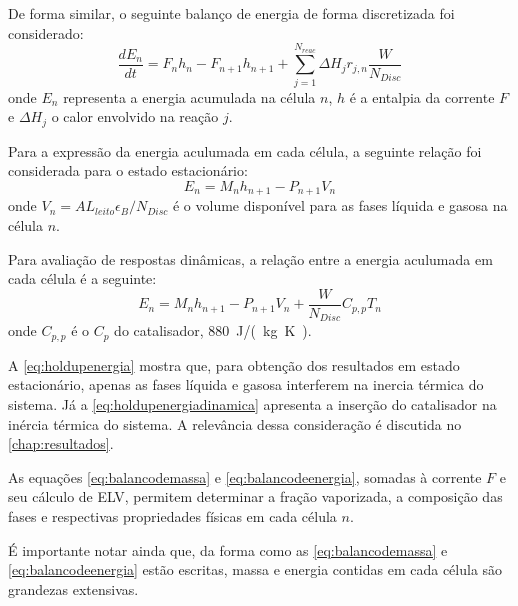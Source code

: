 De forma similar, o seguinte balanço de energia de forma
discretizada foi considerado:
\begin{equation}
\dfrac{dE_{n}}{dt} = F_nh_{n} - F_{n+1}h_{n+1} +
\displaystyle\sum_{j=1}^{N_{reac}} \Delta H_{j}r_{j,n} \dfrac{W}{N_{Disc}}
\label{eq:balancodeenergia}
\end{equation}
onde $E_{n}$ representa a energia acumulada na célula $n$, $h$ é a entalpia da
corrente $F$ e $\Delta H_{j}$ o calor envolvido na reação $j$.

Para a expressão da energia aculumada em cada célula, a seguinte relação
foi considerada para o estado estacionário:
\begin{equation}
E_{n} = M_{n}h_{n+1} - P_{n+1}V_{n}
\label{eq:holdupenergia}
\end{equation}
onde $V_{n} = AL_{leito}\epsilon_{B}/N_{Disc}$ é o volume disponível para as
fases líquida e gasosa na célula $n$.

Para avaliação de respostas dinâmicas, a relação entre a energia aculumada em
cada célula é a seguinte:
\begin{equation}
E_{n} = M_{n}h_{n+1} - P_{n+1}V_{n} + 
\dfrac{W}{N_{Disc}}C_{p,p}T_{n}
\label{eq:holdupenergiadinamica}
\end{equation}
onde $C_{p,p}$ é o $C_p$ do catalisador, \SI{880}{J/(kg K)}.

A \autoref{eq:holdupenergia} mostra que, para obtenção dos resultados em estado
estacionário, apenas as fases líquida e gasosa interferem na inercia térmica do
sistema. Já a \autoref{eq:holdupenergiadinamica} apresenta a inserção do
catalisador na inércia térmica do sistema. A relevância dessa consideração é
discutida no \autoref{chap:resultados}.


As equações \ref{eq:balancodemassa} e \ref{eq:balancodeenergia}, somadas
à corrente $F$ e seu cálculo de ELV, permitem determinar a fração vaporizada,
a composição das fases e respectivas propriedades físicas em cada célula $n$.

É importante notar ainda que, da forma como as \autoref{eq:balancodemassa} e
\autoref{eq:balancodeenergia} estão escritas, massa e energia contidas em cada
célula são grandezas extensivas. 

